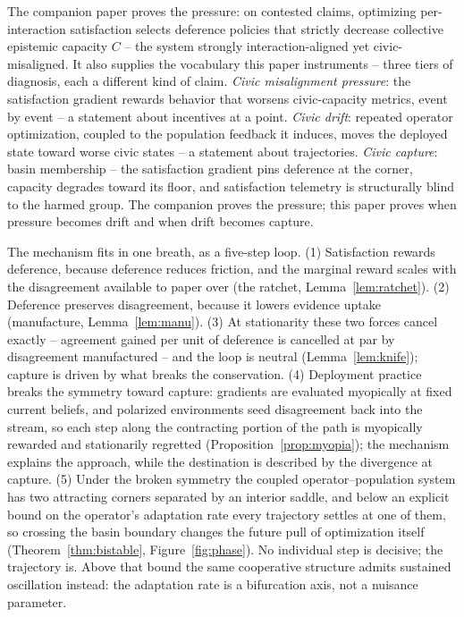 \documentclass[11pt]{article}
\theoremstyle{definition}
\theoremstyle{remark}
\numberwithin{equation}{section}
\begin{document}
The companion paper \citep{hofheinz2026civic} proves the pressure: on contested claims, optimizing per-interaction satisfaction selects deference policies that strictly decrease collective epistemic capacity $C$ -- the system strongly interaction-aligned yet civic-misaligned. It also supplies the vocabulary this paper instruments -- three tiers of diagnosis, each a different kind of claim. \emph{Civic misalignment pressure}: the satisfaction gradient rewards behavior that worsens civic-capacity metrics, event by event -- a statement about incentives at a point. \emph{Civic drift}: repeated operator optimization, coupled to the population feedback it induces, moves the deployed state toward worse civic states -- a statement about trajectories. \emph{Civic capture}: basin membership -- the satisfaction gradient pins deference at the corner, capacity degrades toward its floor, and satisfaction telemetry is structurally blind to the harmed group. The companion proves the pressure; this paper proves when pressure becomes drift and when drift becomes capture.

The mechanism fits in one breath, as a five-step loop. (1) Satisfaction rewards deference, because deference reduces friction, and the marginal reward scales with the disagreement available to paper over (the ratchet, Lemma~\ref{lem:ratchet}). (2) Deference preserves disagreement, because it lowers evidence uptake (manufacture, Lemma~\ref{lem:manu}). (3) At stationarity these two forces cancel exactly -- agreement gained per unit of deference is cancelled at par by disagreement manufactured -- and the loop is neutral (Lemma~\ref{lem:knife}); capture is driven by what breaks the conservation. (4) Deployment practice breaks the symmetry toward capture: gradients are evaluated myopically at fixed current beliefs, and polarized environments seed disagreement back into the stream, so each step along the contracting portion of the path is myopically rewarded and stationarily regretted (Proposition~\ref{prop:myopia}); the mechanism explains the approach, while the destination is described by the divergence at capture. (5) Under the broken symmetry the coupled operator--population system has two attracting corners separated by an interior saddle, and below an explicit bound on the operator's adaptation rate every trajectory settles at one of them, so crossing the basin boundary changes the future pull of optimization itself (Theorem~\ref{thm:bistable}, Figure~\ref{fig:phase}). No individual step is decisive; the trajectory is. Above that bound the same cooperative structure admits sustained oscillation instead: the adaptation rate is a bifurcation axis, not a nuisance parameter.
\end{document}
